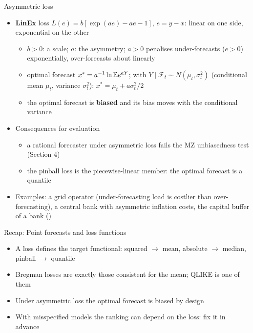 \begin{frame}{Asymmetric loss}
\itemsize{\small}
\begin{itemize}
    \item \textbf{LinEx} loss $L(e) = b[\exp(ae) - ae - 1]$, $e = y - x$: linear on one side, exponential on the other
    \begin{itemize}
        \item $b > 0$: a scale; $a$: the asymmetry; $a > 0$ penalises under-forecasts ($e > 0$) exponentially, over-forecasts about linearly
        \item optimal forecast $x^* = a^{-1}\ln\mathbb{E} e^{aY}$; with $Y \mid \mathcal F_t \sim N(\mu_t, \sigma_t^2)$ (conditional mean $\mu_t$, variance $\sigma_t^2$): $x^* = \mu_t + a\sigma^2_t/2$ 
        \item the optimal forecast is \textbf{biased} and its bias moves with the conditional variance
    \end{itemize}
    \item Consequences for evaluation
    \begin{itemize}
        \item a rational forecaster under asymmetric loss fails the MZ unbiasedness test (Section 4)
        \item the pinball loss is the piecewise-linear member: the optimal forecast is a quantile
    \end{itemize}
    \item Examples: a grid operator (under-forecasting load is costlier than over-forecasting), a central bank with asymmetric inflation costs, the capital buffer of a bank ()
\end{itemize}
\end{frame}

\begin{frame}{Recap: Point forecasts and loss functions}
\itemsize{\small}
\begin{itemize}
    \item A loss defines the target functional: squared $\to$ mean, absolute $\to$ median, pinball $\to$ quantile
    \item Bregman losses are exactly those consistent for the mean; QLIKE is one of them
    \item Under asymmetric loss the optimal forecast is biased by design
    \item With misspecified models the ranking can depend on the loss: fix it in advance
\end{itemize}
\end{frame}


